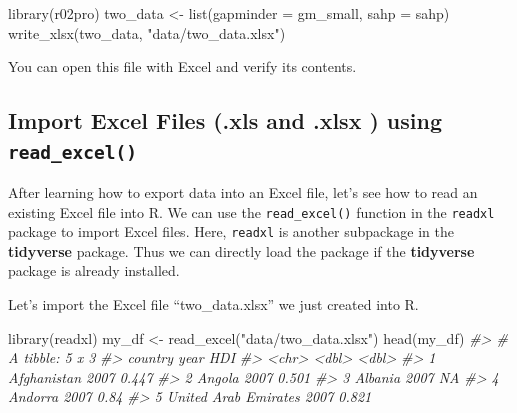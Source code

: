 \documentclass[
]{book}
\newenvironment{Shaded}{\begin{snugshade}}{\end{snugshade}}
\newcommand{\AttributeTok}[1]{\textcolor[rgb]{0.77,0.63,0.00}{#1}}
\newcommand{\CommentTok}[1]{\textcolor[rgb]{0.56,0.35,0.01}{\textit{#1}}}
\newcommand{\FunctionTok}[1]{\textcolor[rgb]{0.00,0.00,0.00}{#1}}
\newcommand{\NormalTok}[1]{#1}
\newcommand{\OtherTok}[1]{\textcolor[rgb]{0.56,0.35,0.01}{#1}}
\newcommand{\StringTok}[1]{\textcolor[rgb]{0.31,0.60,0.02}{#1}}
\begin{document}
\begin{Shaded}
\begin{Highlighting}[]
\FunctionTok{library}\NormalTok{(r02pro)}
\NormalTok{two\_data }\OtherTok{\textless{}{-}} \FunctionTok{list}\NormalTok{(}\AttributeTok{gapminder =}\NormalTok{ gm\_small, }\AttributeTok{sahp =}\NormalTok{ sahp)}
\FunctionTok{write\_xlsx}\NormalTok{(two\_data, }\StringTok{"data/two\_data.xlsx"}\NormalTok{)}
\end{Highlighting}
\end{Shaded}

You can open this file with Excel and verify its contents.

\hypertarget{import-excel-files-.xls-and-.xlsx-using-read_excel}{%
\subsection{\texorpdfstring{Import Excel Files (.xls and .xlsx ) using \texttt{read\_excel()}}{Import Excel Files (.xls and .xlsx ) using read\_excel()}}\label{import-excel-files-.xls-and-.xlsx-using-read_excel}}

After learning how to export data into an Excel file, let's see how to read an existing Excel file into R. We can use the \texttt{read\_excel()} function in the \texttt{readxl} package to import Excel files. Here, \texttt{readxl} is another subpackage in the \textbf{tidyverse} package. Thus we can directly load the package if the \textbf{tidyverse} package is already installed.

Let's import the Excel file ``two\_data.xlsx'' we just created into R.

\begin{Shaded}
\begin{Highlighting}[]
\FunctionTok{library}\NormalTok{(readxl)}
\NormalTok{my\_df }\OtherTok{\textless{}{-}} \FunctionTok{read\_excel}\NormalTok{(}\StringTok{"data/two\_data.xlsx"}\NormalTok{)}
\FunctionTok{head}\NormalTok{(my\_df)}
\CommentTok{\#\textgreater{} \# A tibble: 5 x 3}
\CommentTok{\#\textgreater{}   country               year    HDI}
\CommentTok{\#\textgreater{}   \textless{}chr\textgreater{}                \textless{}dbl\textgreater{}  \textless{}dbl\textgreater{}}
\CommentTok{\#\textgreater{} 1 Afghanistan           2007  0.447}
\CommentTok{\#\textgreater{} 2 Angola                2007  0.501}
\CommentTok{\#\textgreater{} 3 Albania               2007 NA    }
\CommentTok{\#\textgreater{} 4 Andorra               2007  0.84 }
\CommentTok{\#\textgreater{} 5 United Arab Emirates  2007  0.821}
\end{Highlighting}
\end{Shaded}
\end{document}
